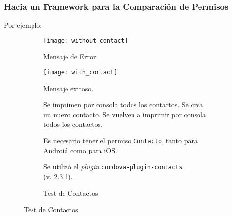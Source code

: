 \begin{frame}
 \frametitle{Hacia un Framework para la Comparación de Permisos}
Por ejemplo:
\begin{figure}[hbp]
    \centering
    \begin{subfigure}{0.28\linewidth}
        \texttt{[image: without\_contact]}
        \caption{Mensaje de Error.}
    \end{subfigure}
    \begin{subfigure}{0.28\linewidth}
        \texttt{[image: with\_contact]}
                \caption{Mensaje exitoso.}
     \end{subfigure}
	\begin{subfigure}{.42\linewidth}
	\begin{algorithm}[H]
    \scriptsize
	\begin{algorithmic}[1]
		\STATE Se imprimen por consola todos los contactos.
		\STATE Se crea un nuevo contacto.
		\STATE Se vuelven a imprimir por consola \\todos los contactos.
	\end{algorithmic}
	\caption{\centering Test de Contactos}
   \end{algorithm}
   \begin{block}{}\small
    {Es necesario tener el permiso \texttt{Contacto}, tanto para Android como para iOS.}
   \end{block}
   \begin{block}{}\small
 {Se utilizó el \textit{plugin} \texttt{cordova-plugin-contacts} \\(v. 2.3.1).}
   \end{block}
   \end{subfigure}
    \end{figure}
\end{frame}
